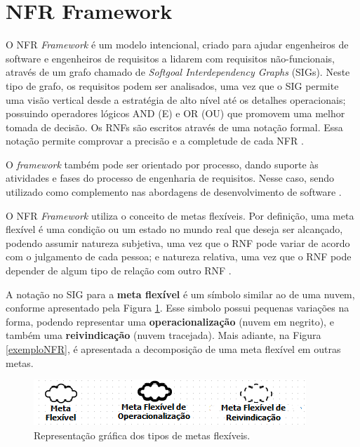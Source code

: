 \section{NFR Framework}
\label{sec:NFR}

O NFR \textit{Framework}  é um modelo intencional, criado para ajudar engenheiros de software e engenheiros de requisitos a lidarem com requisitos não-funcionais, através de um grafo chamado de \textit{Softgoal Interdependency Graphs} (SIGs). Neste tipo de grafo, os requisitos podem ser analisados, uma vez que o SIG permite uma visão vertical desde a estratégia de alto nível até os detalhes operacionais;  possuindo operadores lógicos AND (E) e OR (OU) que promovem uma melhor tomada de decisão. Os RNFs são escritos através de uma notação formal. Essa notação permite comprovar a precisão e a completude de cada NFR \cite{chung2012non}. 

O \textit{framework} também pode ser orientado por processo, dando suporte às atividades e fases do processo de engenharia de requisitos. Nesse caso, sendo utilizado como complemento nas abordagens de desenvolvimento de software \cite{chung2012non}.

O NFR \textit{Framework} utiliza o conceito de metas  flexíveis. Por definição, uma meta flexível é uma condição ou um estado no mundo real que deseja ser alcançado, podendo assumir natureza subjetiva, uma vez que o RNF pode variar de acordo com o julgamento de cada pessoa; e natureza relativa, uma vez que o RNF pode depender de algum tipo de relação com outro RNF \cite{chung2012non}.

A notação no SIG para a \textbf{meta flexível} é um símbolo similar ao de uma nuvem, conforme apresentado pela Figura \ref{fig01}. Esse simbolo possui pequenas variações na forma, podendo representar uma \textbf{operacionalização} (nuvem em negrito), e também uma \textbf{reivindicação} (nuvem tracejada). Mais adiante, na Figura \ref{exemploNFR}, é apresentada a decomposição de uma meta flexível em outras metas.  

\begin{figure}[h!]
	\centering
	\includegraphics[keepaspectratio=true,scale=0.9]{figuras/tiposDeSoftgoals.png}
	\caption{Representação gráfica dos tipos de metas flexíveis.}
	\label{fig01}
\end{figure} 

